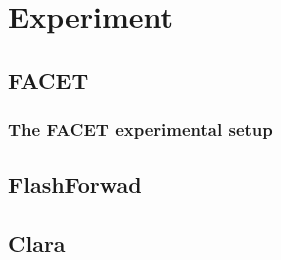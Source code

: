 \chapter{Experiment}
\section{FACET}
\subsection{The FACET experimental setup}

\section{FlashForwad}
\section{Clara}

